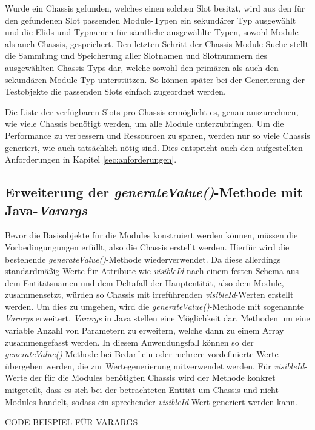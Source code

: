 Wurde ein Chassis gefunden, welches einen solchen Slot besitzt, wird aus den für den gefundenen Slot passenden Module-Typen ein sekundärer Typ ausgewählt und die \ac{Elid}s und Typnamen für sämtliche ausgewählte Typen, sowohl Module als auch Chassis, gespeichert. Den letzten Schritt der Chassis-Module-Suche stellt die Sammlung und Speicherung aller Slotnamen und Slotnummern des ausgewählten Chassis-Typs dar, welche sowohl den primären als auch den sekundären Module-Typ unterstützen. So können später bei der Generierung der Testobjekte die passenden Slots einfach zugeordnet werden.

Die Liste der verfügbaren Slots pro Chassis ermöglicht es, genau auszurechnen, wie viele Chassis benötigt werden, um alle Module unterzubringen. Um die Performance zu verbessern und Ressourcen zu sparen, werden nur so viele Chassis generiert, wie auch tatsächlich nötig sind. Dies entspricht auch den aufgestellten Anforderungen in Kapitel \ref{sec:anforderungen}.

\subsection{Erweiterung der \textit{generateValue()}-Methode mit Java-\textit{Varargs}}\label{subsec:varargs}
Bevor die Basisobjekte für die Modules konstruiert werden können, müssen die Vorbedingungungen erfüllt, also die Chassis erstellt werden. Hierfür wird die bestehende \textit{generateValue()}-Methode wiederverwendet. Da diese allerdings standardmäßig Werte für Attribute wie \textit{visibleId} nach einem festen Schema aus dem Entitätsnamen und dem Deltafall der Hauptentität, also dem Module, zusammensetzt, würden so Chassis mit irreführenden \textit{visibleId}-Werten erstellt werden. Um dies zu umgehen, wird die \textit{generateValue()}-Methode mit sogenannte \textit{Varargs} erweitert. \textit{Varargs} in Java stellen eine Möglichkeit dar, Methoden um eine variable Anzahl von Parametern zu erweitern, welche dann zu einem Array zusammengefasst werden. \cite[S. 11]{naftalin:2006} In diesem Anwendungsfall können so der \textit{generateValue()}-Methode bei Bedarf ein oder mehrere vordefinierte Werte übergeben werden, die zur Wertegenerierung mitverwendet werden. Für \textit{visibleId}-Werte der für die Modules benötigten Chassis wird der Methode konkret mitgeteilt, dass es sich bei der betrachteten Entität um Chassis und nicht Modules handelt, sodass ein sprechender \textit{visibleId}-Wert generiert werden kann.

CODE-BEISPIEL FÜR VARARGS

